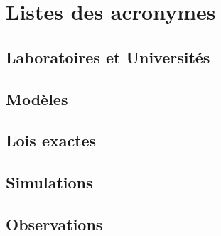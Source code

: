 \chapter*{Listes des acronymes} \hypertarget{list:ac}{}
\renewcommand\partie{Liste des acronymes}
\mtcaddchapter
\section*{Laboratoires et Universités}

\section*{Modèles}

\section*{Lois exactes}

\section*{Simulations}

\section*{Observations}

